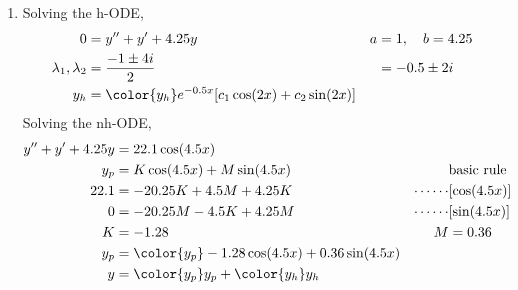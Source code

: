 \begin{enumerate}
    \item Solving the h-ODE,
          \begin{align}
              0                        & = y'' + y' + 4.25y                     &
              a                        & = 1, \quad b = 4.25                      \\
              \lambda_{1}, \lambda_{2} & = \frac{-1 \pm 4i}{2}                  &
                                       & = -0.5 \pm 2i                            \\
              y_{h}                    & = \color{y_h} e^{-0.5x}[c_{1} \cos(2x)
                      + c_{2} \sin(2x)]
          \end{align}
          Solving the nh-ODE,
          \begin{align}
              y'' + y' + 4.25y & = 22.1 \cos(4.5x)                                  \\
              y_{p}            & = K \cos(4.5x) + M \sin(4.5x)                    &
                               & \text{basic rule}                                  \\
              22.1             & = -20.25K + 4.5M + 4.25K                         &
              \cdots\cdots     & [\cos(4.5x)]                                       \\
              0                & = -20.25M - 4.5K + 4.25M                         &
              \cdots\cdots     & [\sin(4.5x)]                                       \\
              K                & = -1.28                                          &
              M                & = 0.36                                             \\
              y_{p}            & = \color{y_p} -1.28 \cos(4.5x) + 0.36 \sin(4.5x)   \\
              y                & = {\color{y_p} y_{p}} + {\color{y_h} y_{h}}
          \end{align}


\end{enumerate}
